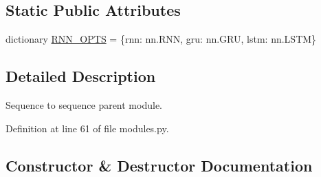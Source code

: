 \subsection*{Static Public Attributes}
\begin{DoxyCompactItemize}
\item 
dictionary \hyperlink{classparlai_1_1agents_1_1seq2seq_1_1modules_1_1Seq2seq_a3962ff3f0654a2808f13d677c7192fa2}{R\+N\+N\+\_\+\+O\+P\+TS} = \{\textquotesingle{}rnn\textquotesingle{}\+: nn.\+R\+NN, \textquotesingle{}gru\textquotesingle{}\+: nn.\+G\+RU, \textquotesingle{}lstm\textquotesingle{}\+: nn.\+L\+S\+TM\}
\end{DoxyCompactItemize}


\subsection{Detailed Description}
\begin{DoxyVerb}Sequence to sequence parent module.
\end{DoxyVerb}
 

Definition at line 61 of file modules.\+py.



\subsection{Constructor \& Destructor Documentation}
\mbox{\label{classparlai_1_1agents_1_1seq2seq_1_1modules_1_1Seq2seq_a8e8ad02405bcaf384e154a0e238fc10d}} 
